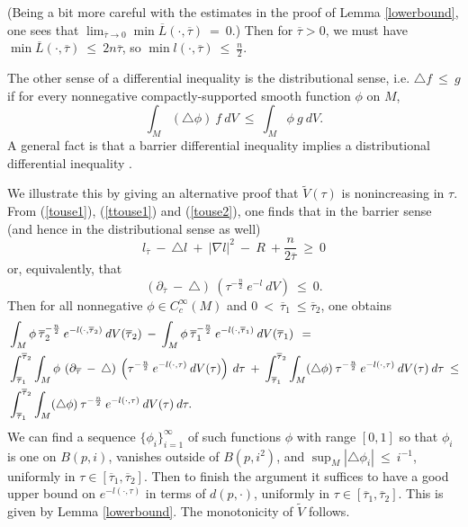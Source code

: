 (Being a bit more careful with the
estimates in the proof of Lemma \ref{lowerbound}, one sees that
$\lim_{\overline{\tau} \rightarrow 0}
\min \overline{L}(\cdot, \overline{\tau}) \: = \: 0$.)
Then for $\overline{\tau} > 0$, we must have
$\min \overline{L}(\cdot, \overline{\tau}) \: \le \:
2n \overline{\tau}$, so $\min l(\cdot, \overline{\tau}) \: \le \:
\frac{n}{2}$.

The other sense of a differential inequality is the distributional
sense, i.e. $\triangle f \: \le \: g$ if for every nonnegative
compactly-supported smooth function $\phi$ on $M$,
\begin{equation}
\int_M (\triangle \phi) \: f \: dV \: \le \: \int_M \phi \: g \: dV.
\end{equation}
A general fact is that a barrier differential inequality implies
a distributional differential inequality
\cite{Ishii,Ye1}.

We illustrate this by giving an alternative proof that
$\tilde{V}(\tau)$ is nonincreasing in $\tau$.
From (\ref{touse1}), (\ref{ttouse1}) and
(\ref{touse2}),
one finds that in the barrier sense (and hence in the distributional sense
as well)
\begin{equation}
l_{\overline{\tau}} \: - \: \triangle l \: + \: |\nabla l|^2 \: - \: R
\: + \frac{n}{2\overline{\tau}} \: \ge \: 0
\end{equation}
or, equivalently, that
\begin{equation} \label{illustrate}
\left( \partial_{\overline{\tau}} \: -\: \triangle \right) \:
\left( \tau^{-\frac{n}{2}} \: e^{-l}  \: dV \right) \: \le \: 0.
\end{equation}
Then for all nonnegative $\phi \in C^\infty_c(M)$ and
$0 \: < \: \overline{\tau}_1 \: \le \overline{\tau}_2$, one obtains
\begin{align} \label{pphieqn}
& \int_M \phi \: \overline{\tau}_2^{-\frac{n}{2}} \:
e^{-l(\cdot,\overline{\tau}_2)} \: dV(\overline{\tau}_2) \: - \:
\int_M \phi \: \overline{\tau}_1^{-\frac{n}{2}} \:
e^{-l(\cdot,\overline{\tau}_1)} \: dV(\overline{\tau}_1) \:
\: = \: \\
& \int_{\overline{\tau}_1}^{\overline{\tau}_2} \int_M  \phi \:
\left( \partial_{\overline{\tau}} \: -\: \triangle \right) \: \left(
\tau^{-\frac{n}{2}} \:
e^{-l(\cdot,\tau)} \: dV(\tau) \right) \: d\tau \: + \:
\int_{\overline{\tau}_1}^{\overline{\tau}_2} \int_M (\triangle \phi) \:
\tau^{-\frac{n}{2}} \:
e^{-l(\cdot,\tau)} \: dV(\tau) \: d\tau \: \le \notag \\
&
\int_{\overline{\tau}_1}^{\overline{\tau}_2} \int_M (\triangle \phi) \:
\tau^{-\frac{n}{2}} \:
e^{-l(\cdot,\tau)} \: dV(\tau) \: d\tau.   \notag
\end{align}
We can find a sequence $\{\phi_i\}_{i=1}^\infty$ of such functions $\phi$
with range $[0,1]$ so
that $\phi_i$ is one on $B(p, i)$, vanishes outside of $B(p, i^2)$, and
$\sup_M |\triangle \phi_i| \: \le \: i^{-1}$,
uniformly in $\tau \in [\overline{\tau}_1, \overline{\tau}_2]$.
Then to finish the argument it suffices to have a good upper bound on
$e^{-l(\cdot,\tau)}$ in terms of $d(p, \cdot)$, uniformly in
$\tau \in [\overline{\tau}_1, \overline{\tau}_2]$.
This is given by Lemma \ref{lowerbound}.
The monotonicity of $\tilde{V}$ follows.

